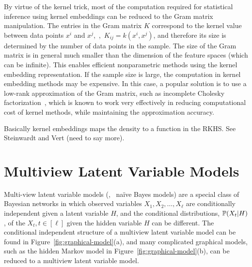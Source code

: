 \documentclass{article}
\begin{document}
By virtue of the kernel trick, most of the computation required for statistical inference using kernel embeddings can be reduced to the Gram matrix manipulation. The entries in the Gram matrix $K$ correspond to the kernel value between data points $x^i$ and $x^j$,~\ie,~$K_{ij} = k(x^i,x^j)$, and therefore its size is determined by the number of data points in the sample. The size of the Gram matrix is in general much smaller than the dimension of the feature spaces (which can be infinite). This enables efficient nonparametric methods using the kernel embedding representation. If the sample size is large, the computation in kernel embedding methods may be expensive. In this case, a popular solution is to use a low-rank approximation of the Gram matrix, such as incomplete Cholesky factorization~\cite{FinSch01}, which is known to work very effectively in reducing computational cost of kernel methods, while maintaining the approximation accuracy.

 Basically kernel embeddings maps the density to a function in the RKHS. See Steinwardt and Vert (need to say more).


\section{Multiview Latent Variable Models}

Multi-view latent variable models (\eg, \, na\"ive Bayes models) are a
special class of Bayesian networks in which observed variables $X_1, X_2,
\ldots, X_\ell$ are conditionally independent given a latent variable $H$, and
the conditional distributions, $\mathbb{P}(X_t|H)$, of the $X_t, t \in [\ell]$ given the hidden variable $H$ can be different. The conditional independent structure of a multiview latent variable model can be found in Figure~\ref{fig:graphical-model}(a), and many complicated graphical models, such as the hidden Markov model in Figure~\ref{fig:graphical-model}(b), can be reduced to a multiview latent variable model.
\end{document}
